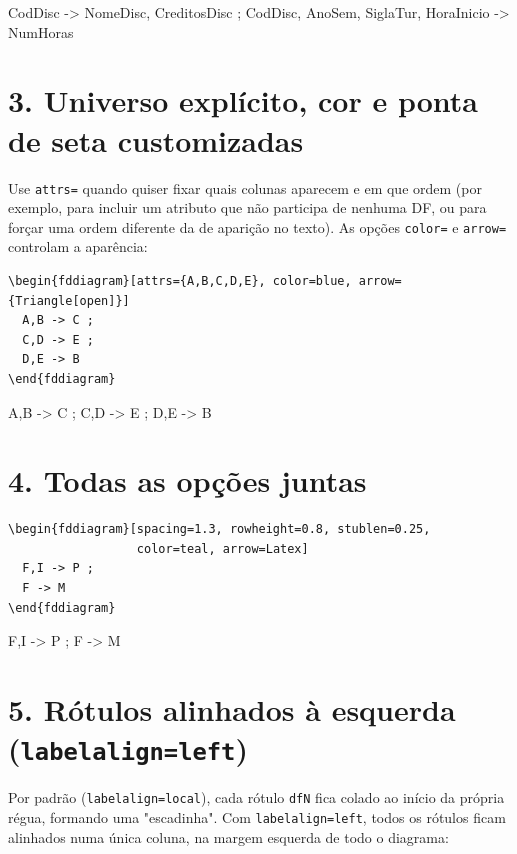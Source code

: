 \documentclass[a4paper]{article}
\begin{document}
\begin{fddiagram}[spacing=2.2]
  CodDisc -> NomeDisc, CreditosDisc ;
  CodDisc, AnoSem, SiglaTur, HoraInicio -> NumHoras
\end{fddiagram}

\section*{3. Universo explícito, cor e ponta de seta customizadas}

Use \texttt{attrs=} quando quiser fixar quais colunas aparecem e em
que ordem (por exemplo, para incluir um atributo que não participa de
nenhuma DF, ou para forçar uma ordem diferente da de aparição no
texto). As opções \texttt{color=} e \texttt{arrow=} controlam a
aparência:

\begin{verbatim}
\begin{fddiagram}[attrs={A,B,C,D,E}, color=blue, arrow={Triangle[open]}]
  A,B -> C ;
  C,D -> E ;
  D,E -> B
\end{fddiagram}
\end{verbatim}

\begin{fddiagram}[attrs={A,B,C,D,E}, color=blue, arrow={Triangle[open]}]
  A,B -> C ;
  C,D -> E ;
  D,E -> B
\end{fddiagram}

\section*{4. Todas as opções juntas}

\begin{verbatim}
\begin{fddiagram}[spacing=1.3, rowheight=0.8, stublen=0.25,
                  color=teal, arrow=Latex]
  F,I -> P ;
  F -> M
\end{fddiagram}
\end{verbatim}

\begin{fddiagram}[spacing=1.3, rowheight=0.8, stublen=0.25,
                  color=teal, arrow=Latex]
  F,I -> P ;
  F -> M
\end{fddiagram}

\section*{5. Rótulos alinhados à esquerda (\texttt{labelalign=left})}

Por padrão (\texttt{labelalign=local}), cada rótulo \texttt{dfN} fica
colado ao início da própria régua, formando uma "escadinha". Com
\texttt{labelalign=left}, todos os rótulos ficam alinhados numa única
coluna, na margem esquerda de todo o diagrama:
\end{document}
